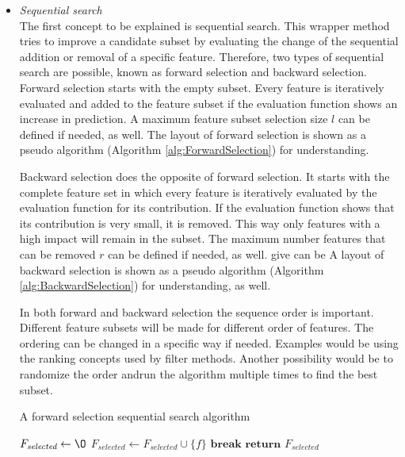	\begin{itemize}
		\item \textit{Sequential search} \\
		The first concept to be explained is sequential search. This wrapper method tries to improve a candidate subset by evaluating the change of the sequential addition or removal of a specific feature. Therefore, two types of sequential search are possible, known as forward selection and backward selection. Forward selection starts with the empty subset. Every feature is iteratively evaluated and added to the feature subset if the evaluation function shows an increase in prediction. A maximum feature subset selection size $l$  can be defined if needed, as well. The layout of forward selection is shown as a pseudo algorithm (Algorithm \ref{alg:ForwardSelection}) for understanding\cite{Reunanen2006}.
		
		Backward selection does the opposite of forward selection. It starts with the complete feature set in which every feature is iteratively evaluated by the evaluation function for its contribution. If the evaluation function shows that its contribution is very small, it is removed. This way only features with a high impact will remain in the subset. The maximum number features that can be removed $r$ can be defined if needed, as well. give can be A layout of backward selection is shown as a pseudo algorithm (Algorithm \ref{alg:BackwardSelection}) for understanding, as well\cite{Reunanen2006}.
		
		In both forward and backward selection the sequence order is important. Different feature subsets will be made for different order of features. The ordering can be changed in a specific way if needed. Examples would be using the ranking concepts used by filter methods. Another possibility would be to randomize the order andrun the algorithm multiple times to find the best subset\cite{Reunanen2006}.
		
		\begin{algorithm}[H]
			\caption{A forward selection sequential search algorithm\cite{Reunanen2006}}\label{alg:ForwardSelection}
			\begin{algorithmic}[1]
				\State $F_{\textit{selected}} \gets \O$				
											
					
				\State $F_{\textit{selected}} \gets F_{\textit{selected}} \cup \{f\}$	
				\EndIf
						
				\State $\textbf{break}$
				\EndIf
				\EndFor
				\State $\textbf{return } F_{\textit{selected}}$
				\EndProcedure
			\end{algorithmic}
		\end{algorithm}
	

\end{itemize}
